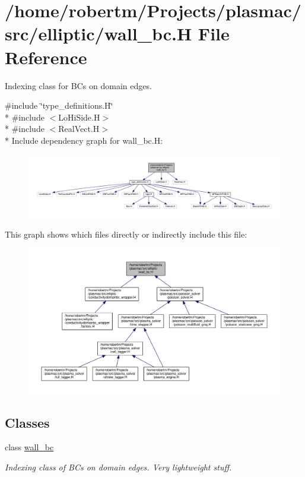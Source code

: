 \hypertarget{wall__bc_8H}{}\section{/home/robertm/\+Projects/plasmac/src/elliptic/wall\+\_\+bc.H File Reference}
\label{wall__bc_8H}


Indexing class for B\+Cs on domain edges.  


{\ttfamily \#include \char`\"{}type\+\_\+definitions.\+H\char`\"{}}\\*
{\ttfamily \#include $<$Lo\+Hi\+Side.\+H$>$}\\*
{\ttfamily \#include $<$Real\+Vect.\+H$>$}\\*
Include dependency graph for wall\+\_\+bc.\+H\+:\nopagebreak
\begin{figure}[H]
\begin{center}
\leavevmode
\includegraphics[width=350pt]{wall__bc_8H__incl}
\end{center}
\end{figure}
This graph shows which files directly or indirectly include this file\+:\nopagebreak
\begin{figure}[H]
\begin{center}
\leavevmode
\includegraphics[width=350pt]{wall__bc_8H__dep__incl}
\end{center}
\end{figure}
\subsection*{Classes}
\begin{DoxyCompactItemize}
\item 
class \hyperlink{classwall__bc}{wall\+\_\+bc}
\begin{DoxyCompactList}\small\item\em Indexing class of B\+Cs on domain edges. Very lightweight stuff. \end{DoxyCompactList}\end{DoxyCompactItemize}


